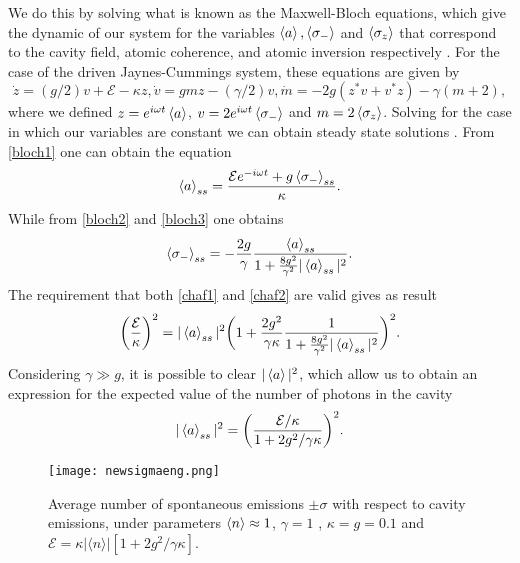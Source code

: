 \documentclass[conference]{IEEEtran}
\begin{document}
We do this by solving what is known as the Maxwell-Bloch equations, which give the dynamic of our system for the variables  $\expval{a}, \expval{\sigma_-}$ and $\expval{\sigma_z}$ that correspond to the cavity field, atomic coherence, and atomic inversion respectively \cite{Alsing_1991}. For the case of the driven Jaynes-Cummings system, these equations are given by
\begin{subequations} \label{maxbloch}
\begin{equation} \label{bloch1}
\dot{z} = (g/2)v + \mathcal{E} - \kappa z,
\end{equation}
\begin{equation} \label{bloch2}
\dot{v} = gmz - (\gamma/2)v,
\end{equation}
\begin{equation} \label{bloch3}
\dot{m} = -2g(z^*v + v^*z) - \gamma(m + 2),
\end{equation}
\end{subequations} 
where we defined  $z = e^{i\omega t}\expval{a}$, $v = 2e^{i\omega t}\expval{\sigma_-}$ and $m = 2\expval{\sigma_z}$. Solving for the case in which our variables are constant we can obtain steady state solutions \cite{gagniuc2017markov}.  From \eqref{bloch1} one can obtain the equation
\begin{equation} \label{chaf1}
\expval{a}_{ss} = \frac{\mathcal{E}e^{-i\omega t} + g\expval{\sigma_-}_{ss}}{\kappa}.
\end{equation}
While from \eqref{bloch2} and \eqref{bloch3} one obtains
\begin{equation} \label{chaf2}
\expval{\sigma_-}_{ss} = -\frac{2g}{\gamma}\frac{\expval{a}_{ss}}{1 + \frac{8g^2}{\gamma^2}|\expval{a}_{ss}|^2}.
\end{equation}
The requirement that both \eqref{chaf1} and \eqref{chaf2} are valid gives as result
\begin{equation}
\bigg(\frac{\mathcal{E}}{\kappa}\bigg)^2 = |\expval{a}_{ss}|^2 \bigg(1 + \frac{2g^2}{\gamma \kappa}\frac{1}{1 + \frac{8g^2}{\gamma^2}|\expval{a}_{ss}|^2}\bigg)^2.
\end{equation}
Considering $\gamma \gg g$, it is possible to clear $|\expval{a}|^2$, which allow us to obtain an expression for the expected value of the number of photons in the cavity
\begin{equation} \label{numfo}
|\expval{a}_{ss}|^2 = \bigg(\frac{\mathcal{E}/\kappa}{1 + 2g^2/\gamma \kappa}\bigg)^2.
\end{equation}
\begin{figure}[!t]  
\centering
\texttt{[image: newsigmaeng.png]}
\caption{\small{Average number of spontaneous emissions $\pm \sigma$ with respect to cavity emissions, under parameters $\expval{n} \approx 1$, $\gamma = 1$ , $\kappa = g = 0.1$ and $\mathcal{E} =  \kappa |\langle n \rangle|[1 + 2g^2/\gamma \kappa]$.}}
\label{graph}
\end{figure} 
\end{document}
